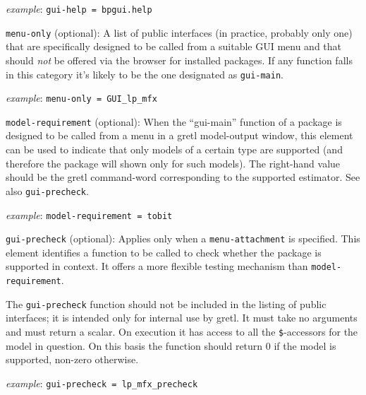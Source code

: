 \documentclass[oneside]{book}
\newcommand{\ttusage}[1]{\textit{example}: \quad \texttt{#1}}
\newcommand{\vbusage}[0]{\textit{example}: \quad}
\begin{document}
\begin{description}
  \ttusage{gui-help = bpgui.help}

\item \texttt{menu-only} (optional): A list of public interfaces (in
  practice, probably only one) that are specifically designed to be
  called from a suitable GUI menu and that should \textit{not} be
  offered via the browser for installed packages. If any function
  falls in this category it's likely to be the one designated as
  \texttt{gui-main}.

  \vbusage{} \verb|menu-only = GUI_lp_mfx|

\item \texttt{model-requirement} (optional): When the ``gui-main''
  function of a package is designed to be called from a menu in a
  gretl model-output window, this element can be used to indicate that
  only models of a certain type are supported (and therefore the
  package will shown only for such models).  The right-hand value
  should be the gretl command-word corresponding to the supported
  estimator. See also \texttt{gui-precheck}.

  \ttusage{model-requirement = tobit}

\item \texttt{gui-precheck} (optional): Applies only when a
  \texttt{menu-attachment} is specified. This element identifies a
  function to be called to check whether the package is supported in
  context.  It offers a more flexible testing mechanism than
  \texttt{model-requirement}.

  The \texttt{gui-precheck} function should not be included in the
  listing of public interfaces; it is intended only for internal use
  by gretl. It must take no arguments and must return a scalar. On
  execution it has access to all the \texttt{\$}-accessors for the
  model in question. On this basis the function should return 0 if the
  model is supported, non-zero otherwise.

  \vbusage{} \verb|gui-precheck = lp_mfx_precheck|


\end{description}
\end{document}
